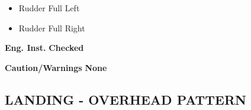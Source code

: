 \documentclass[fontSpartan]{TechCheck}
\begin{document}
\begin{tablenumerate}
{\begin{subenumerate}
\begin{itemize}
				\item Rudder Full Left
				\item Rudder Full Right
			\end{itemize}
			\item \textbf{Eng. Inst.} \dotfill \textbf{Checked}
			\item \textbf{Caution/Warnings}  \dotfill\textbf{None}
		\end{subenumerate}}
	\end{tablenumerate}

	\subsection{LANDING - OVERHEAD PATTERN}
	\begin{center}
	\end{center}
\end{document}
